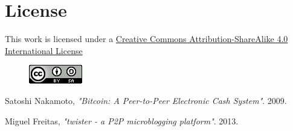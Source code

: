 \documentclass[12pt]{article}
\begin{document}
\newpage

\section*{License}

This work is licensed under a \href{http://creativecommons.org/licenses/by-sa/4.0/}{Creative Commons Attribution-ShareAlike 4.0 International License}

\begin{figure}[H]
\includegraphics{cc-by-sa.png}
\end{figure}

\newpage

\begin{thebibliography}{9}

  Satoshi Nakamoto,
  \emph{"Bitcoin: A Peer-to-Peer Electronic Cash System"}.
  2009.

  Miguel Freitas,
  \emph{"twister - a P2P microblogging platform"}.
  2013.

\end{thebibliography}
\end{document}
